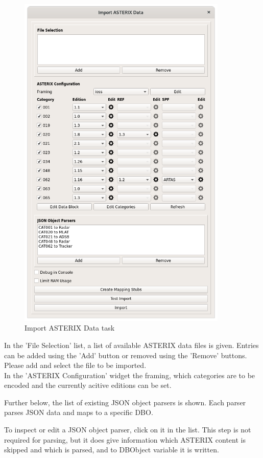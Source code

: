 \begin{figure}[H]
  \center
    \includegraphics[width=10cm]{../screenshots/asterix_import_data.png}
  \caption{Import ASTERIX Data task}
\end{figure}

In the 'File Selection' list, a list of available ASTERIX data files is given. Entries can be added using the 'Add' button or removed using the 'Remove' buttons. Please add and select the file to be imported.\\

In the 'ASTERIX Configuration' widget the framing, which categories are to be encoded and the currently acitive editions can be set.

Further below, the list of existing JSON object parsers is shown. Each parser parses JSON data and maps to a specific DBO. 

To inspect or edit a JSON object parser, click on it in the list. This step is not required for parsing, but it does give information which ASTERIX content is skipped and which is parsed, and to DBObject variable it is written. \\\\

